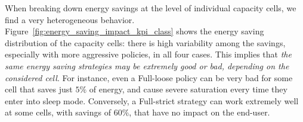 When breaking down energy savings at the level of individual capacity cells, we find a very heterogeneous behavior.
Figure~\ref{fig:energy_saving_impact_kpi_class} shows the energy saving distribution of the capacity cells: there is high variability among the savings, especially with more aggressive policies, in all four cases. This implies that \textit{the same energy saving strategies may be extremely good or bad, depending on the considered cell}. For instance, even a Full-loose policy can be very bad for some cell that saves just $5\%$ of energy, and cause severe saturation every time they enter into sleep mode. Conversely, a Full-strict strategy can work extremely well at some cells, with savings of $60\%$, that have no impact on the end-user.